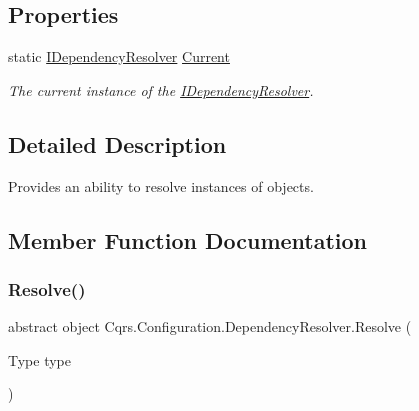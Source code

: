 \subsection*{Properties}
\begin{DoxyCompactItemize}
\item 
static \hyperlink{interfaceCqrs_1_1Configuration_1_1IDependencyResolver}{I\+Dependency\+Resolver} \hyperlink{classCqrs_1_1Configuration_1_1DependencyResolver_aaede4bbd564000f2becf65e8be863fff_aaede4bbd564000f2becf65e8be863fff}{Current}
\begin{DoxyCompactList}\small\item\em The current instance of the \hyperlink{interfaceCqrs_1_1Configuration_1_1IDependencyResolver}{I\+Dependency\+Resolver}. \end{DoxyCompactList}\end{DoxyCompactItemize}


\subsection{Detailed Description}
Provides an ability to resolve instances of objects. 



\subsection{Member Function Documentation}
\mbox{\label{classCqrs_1_1Configuration_1_1DependencyResolver_aaeeb3ad2e0ef44bd98469d843210205c_aaeeb3ad2e0ef44bd98469d843210205c}} 
\subsubsection{\texorpdfstring{Resolve()}{Resolve()}}
{\footnotesize\ttfamily abstract object Cqrs.\+Configuration.\+Dependency\+Resolver.\+Resolve (\begin{DoxyParamCaption}\item[{Type}]{type }\end{DoxyParamCaption})\hspace{0.3cm}{\ttfamily [pure virtual]}}



